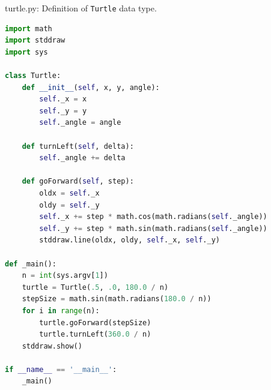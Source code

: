 \documentclass[8pt,a4paper,compress]{beamer}
\begin{document}
\begin{frame}[fragile]
\pause

\begin{framed}
\tiny turtle.py: Definition of \lstinline{Turtle} data type.
\end{framed}

\begin{lstlisting}[language=python,style=focusin]
import math
import stddraw
import sys

class Turtle:
    def __init__(self, x, y, angle):
        self._x = x  
        self._y = y 
        self._angle = angle  
        
    def turnLeft(self, delta):
        self._angle += delta

    def goForward(self, step):
        oldx = self._x
        oldy = self._y
        self._x += step * math.cos(math.radians(self._angle))
        self._y += step * math.sin(math.radians(self._angle))
        stddraw.line(oldx, oldy, self._x, self._y)

def _main():
    n = int(sys.argv[1])
    turtle = Turtle(.5, .0, 180.0 / n)
    stepSize = math.sin(math.radians(180.0 / n))
    for i in range(n):
        turtle.goForward(stepSize)
        turtle.turnLeft(360.0 / n)
    stddraw.show()

if __name__ == '__main__':
    _main()
\end{lstlisting}
\end{frame}
\end{document}
